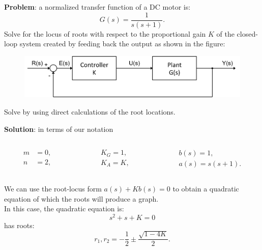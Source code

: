 \begin{frame}
	\begin{example}
		\textbf{Problem}: a normalized transfer function of a DC motor is:
		\begin{equation}
		G(s) = \frac{1}{s(s+1)}.
 		\end{equation}
 		Solve for the locus of roots with respect to the proportional gain $K$ of the closed-loop system created by feeding back the output as shown in the figure:
 		\begin{figure}
 			\centering
 			\includegraphics[width=0.8\linewidth]{closed_loop_diagram}
 		\end{figure}
 		Solve by using direct calculations of the root locations.
	\end{example}
\end{frame}

\begin{frame}
	\begin{exampleblock}{}
		\textbf{Solution}: in terms of our notation
		\vspace{-0.5em}
		\begin{columns}
			\begin{column}{0.2\textwidth}
				\begin{align*}
				m &=0,\\
				n &=2,
				\end{align*}
			\end{column}
			\begin{column}{0.2\textwidth}
				\begin{align*}
				K_G =1,\\
				K_A =K,
				\end{align*}
			\end{column}
			\begin{column}{0.2\textwidth}
				\begin{align*}
				b(s) =1,\\
				a(s) = s(s+1).
				\end{align*}
			\end{column}
		\end{columns}
		\vspace{1em}
		We can use the root-locus form $a(s) + Kb(s) = 0$ to obtain a quadratic equation of which the roots will produce a graph.\\ 
		In this case, the quadratic equation is:
		\begin{equation}
		s^2 + s + K = 0
		\end{equation}
		has roots:
		\begin{equation}
		r_1,r_2 = -\frac{1}{2} \pm \frac{\sqrt{1 - 4K}}{2}.
		\end{equation}
	\end{exampleblock}
\end{frame}

